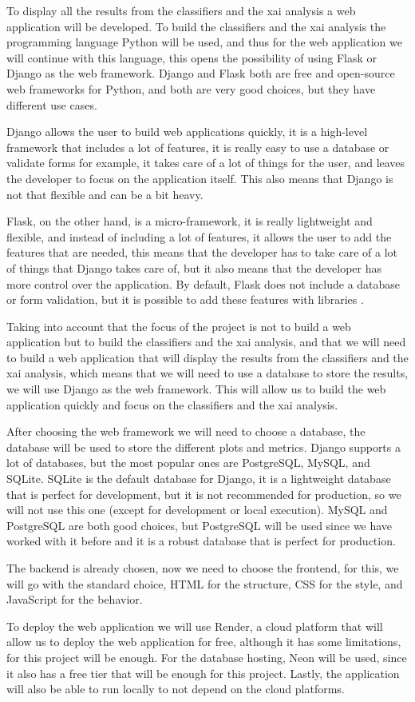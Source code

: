 To display all the results from the classifiers and the \ac{xai} analysis a web application will be developed. To build the classifiers and the \ac{xai} analysis the programming language Python will be used, and thus for the web application we will continue with this language, this opens the possibility of using Flask or Django as the web framework. Django and Flask both are free and open-source web frameworks for Python, and both are very good choices, but they have different use cases.

Django allows the user to build web applications quickly, it is a high-level framework that includes a lot of features, it is really easy to use a database or validate forms for example, it takes care of a lot of things for the user, and leaves the developer to focus on the application itself. This also means that Django is not that flexible and can be a bit heavy.

Flask, on the other hand, is a micro-framework, it is really lightweight and flexible, and instead of including a lot of features, it allows the user to add the features that are needed, this means that the developer has to take care of a lot of things that Django takes care of, but it also means that the developer has more control over the application. By default, Flask does not include a database or form validation, but it is possible to add these features with libraries \cite{noauthor_foreword_nodate}.

Taking into account that the focus of the project is not to build a web application but to build the classifiers and the \ac{xai} analysis, and that we will need to build a web application that will display the results from the classifiers and the \ac{xai} analysis, which means that we will need to use a database to store the results, we will use Django as the web framework. This will allow us to build the web application quickly and focus on the classifiers and the \ac{xai} analysis.

After choosing the web framework we will need to choose a database, the database will be used to store the different plots and metrics. Django supports a lot of databases, but the most popular ones are PostgreSQL, MySQL, and SQLite. SQLite is the default database for Django, it is a lightweight database that is perfect for development, but it is not recommended for production, so we will not use this one (except for development or local execution). MySQL and PostgreSQL are both good choices, but PostgreSQL will be used since we have worked with it before and it is a robust database that is perfect for production.

The backend is already chosen, now we need to choose the frontend, for this, we will go with the standard choice, HTML for the structure, CSS for the style, and JavaScript for the behavior.

To deploy the web application we will use Render, a cloud platform that will allow us to deploy the web application for free, although it has some limitations, for this project will be enough. For the database hosting, Neon will be used, since it also has a free tier that will be enough for this project. Lastly, the application will also be able to run locally to not depend on the cloud platforms.